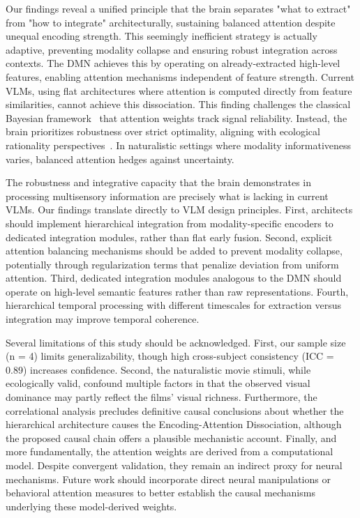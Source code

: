 \documentclass[10pt,letterpaper]{article}
\begin{document}
Our findings reveal a unified principle that the brain separates "what to extract" from "how to integrate" architecturally, sustaining balanced attention despite unequal encoding strength. This seemingly inefficient strategy is actually adaptive, preventing modality collapse and ensuring robust integration across contexts. The DMN achieves this by operating on already-extracted high-level features, enabling attention mechanisms independent of feature strength. Current VLMs, using flat architectures where attention is computed directly from feature similarities, cannot achieve this dissociation. This finding challenges the classical Bayesian framework~\citep{ernst2002humans,knill2004bayesian} that attention weights track signal reliability. Instead, the brain prioritizes robustness over strict optimality, aligning with ecological rationality perspectives~\citep{gigerenzer2009homo}. In naturalistic settings where modality informativeness varies, balanced attention hedges against uncertainty.

The robustness and integrative capacity that the brain demonstrates in processing multisensory information are precisely what is lacking in current VLMs. Our findings translate directly to VLM design principles. First, architects should implement hierarchical integration from modality-specific encoders to dedicated integration modules, rather than flat early fusion. Second, explicit attention balancing mechanisms should be added to prevent modality collapse, potentially through regularization terms that penalize deviation from uniform attention. Third, dedicated integration modules analogous to the DMN should operate on high-level semantic features rather than raw representations. Fourth, hierarchical temporal processing with different timescales for extraction versus integration may improve temporal coherence.

Several limitations of this study should be acknowledged. First, our sample size (n = 4) limits generalizability, though high cross-subject consistency (ICC = 0.89) increases confidence. Second, the naturalistic movie stimuli, while ecologically valid, confound multiple factors in that the observed visual dominance may partly reflect the films' visual richness. Furthermore, the correlational analysis precludes definitive causal conclusions about whether the hierarchical architecture causes the Encoding-Attention Dissociation, although the proposed causal chain offers a plausible mechanistic account. Finally, and more fundamentally, the attention weights are derived from a computational model. Despite convergent validation, they remain an indirect proxy for neural mechanisms. Future work should incorporate direct neural manipulations or behavioral attention measures to better establish the causal mechanisms underlying these model-derived weights.
\end{document}
